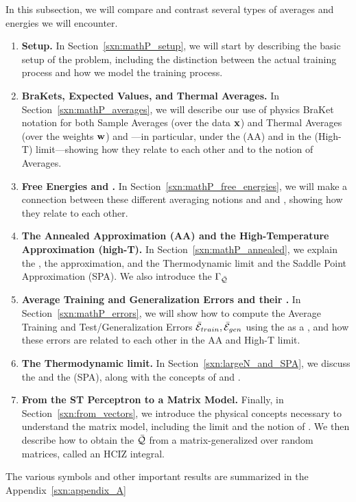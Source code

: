 In this subsection, we will compare and contrast several types of averages and energies we will encounter. 
\begin{enumerate}[label=4.2.\arabic*]
\item
  \textbf{Setup.}
  In Section~\ref{sxn:mathP_setup}, 
we will start by describing the basic setup of the problem, including the distinction between the actual training process and how we model the training process.

 \item
 \textbf{BraKets, Expected Values, and Thermal Averages.}
In Section~\ref{sxn:mathP_averages}, 
we will describe our use of physics BraKet notation for both Sample Averages (over the data ${\mathbf{x}}$) and Thermal Averages (over the weights ${\mathbf{w}}$) and ---in particular, under the \AnnealedApproximation (AA) and in the \HighTemperature (High-T) limit---showing how they relate to each other and to the notion of \Replica Averages.
%
\item
  \textbf{Free Energies and \GeneratingFunctions.} 
In Section~\ref{sxn:mathP_free_energies}, 
we will make a connection between these different averaging notions and \FreeEnergies and \GeneratingFunctions, showing how they relate to each other.
%

\item
  \textbf{The Annealed Approximation (AA) and the High-Temperature Approximation (high-T).}
  In Section~\ref{sxn:mathP_annealed}, we explain the \AnnealedApproximation, the \HighTemperature approximation,
  and the Thermodynamic \LargeN limit and the Saddle Point Approximation (SPA).
  We also introduce the \Quality \GeneratingFunction $\Gamma_{\bar{\mathcal{Q}}}$%
  \item
    \textbf{Average Training and Generalization Errors and their \GeneratingFunctions.}
  In Section~\ref{sxn:mathP_errors}, we will show how to compute the Average Training and Test/Generalization Errors $\bar{\mathcal{E}}_{train}, \bar{\mathcal{E}}_{gen}$
using the \FreeEnergy as a \GeneratingFunction, and how these errors are related to each other in the AA and High-T limit. 
%
\item 
  \textbf{The Thermodynamic limit.}
  In Section~\ref{sxn:largeN_and_SPA}, we discuss the \LargeN \ThermodynamicLimit and the \SaddlePointApproximation (SPA),
  along with the concepts of \SelfAveraging and \WickRotations.
%
\item 
  \textbf{From the ST Perceptron to a Matrix Model.} 
  Finally, in Section~\ref{sxn:from_vectors}, we introduce the physical concepts necessary to understand the \SETOL matrix model, including the \WideLayer \LargeN limit and the notion of \SizeConsistency.  We  then describe how to obtain the \LayerQuality $\bar{\mathcal{Q}}$ from a matrix-generalized \ThermalAverage over random matrices, called an HCIZ integral.
\end{enumerate}
The various symbols and other important results are summarized in the Appendix~\ref{sxn:appendix_A}



